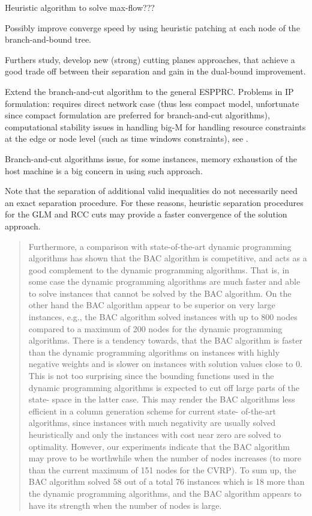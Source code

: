 Heuristic algorithm to solve max-flow???

Possibly improve converge speed by using heuristic patching at each
node of the branch-and-bound tree.

Furthers study, develop new (strong) cutting planes approaches,
that achieve a good trade off between their separation and gain
in the dual-bound improvement.

Extend the branch-and-cut algorithm
to the general ESPPRC.
Problems in IP formulation:
requires direct network case (thus less compact model, unfortunate since compact formulation are
preferred for branch-and-cut algorithms),
computational stability issues in handling big-M
for handling resource constraints at the edge or node level (such as time windows constraints),
see \textcite{jepsen2008branchandcut}.

Branch-and-cut algorithms issue, for some instances,
memory exhaustion of the host machine is a big concern in using such approach.

Note that the separation of additional valid inequalities do not
necessarily need an exact separation procedure.
For these reasons, heuristic separation procedures for the GLM and RCC
cuts may provide a faster convergence of the solution approach.

\begin{quote}
	\cite{jepsen2014}
	Furthermore, a comparison with state-of-the-art dynamic programming algorithms has
	shown that the BAC algorithm is competitive, and acts as a good complement to the dynamic programming algorithms.
	That is, in some case the dynamic programming algorithms are much faster and able to solve instances that cannot be
	solved by the BAC algorithm. On the other hand the BAC algorithm appear to be superior on very large instances, e.g., the
	BAC algorithm solved instances with up to 800 nodes compared to a maximum of 200 nodes for the dynamic programming
	algorithms. There is a tendency towards, that the BAC algorithm is faster than the dynamic programming algorithms on
	instances with highly negative weights and is slower on instances with solution values close to 0. This is not too surprising
	since the bounding functions used in the dynamic programming algorithms is expected to cut off large parts of the state-
	space in the latter case. This may render the BAC algorithms less efficient in a column generation scheme for current state-
	of-the-art algorithms, since instances with much negativity are usually solved heuristically and only the instances with cost
	near zero are solved to optimality. However, our experiments indicate that the BAC algorithm may prove to be worthwhile
	when the number of nodes increases (to more than the current maximum of 151 nodes for the CVRP). To sum up, the BAC
	algorithm solved 58 out of a total 76 instances which is 18 more than the dynamic programming algorithms, and the BAC
	algorithm appears to have its strength when the number of nodes is large.
\end{quote}

